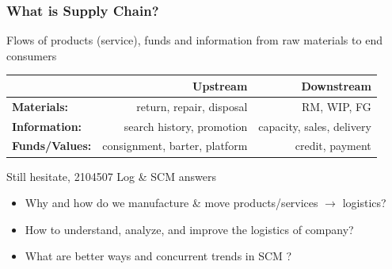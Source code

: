 \documentclass[10pt,handout]{beamer}
\begin{document}
\begin{frame}
  \frametitle{What is Supply Chain?}

  \begin{alertblock}{}{}
  Flows of \alert{products} (service), \alert{funds} and \alert{information} from \alert{raw materials} to \alert{end consumers}
  \end{alertblock}

  \NextLine
  \begin{center}\small{
    \begin{tabular}{l|rr} \hline
                              & Upstream  & Downstream \\ \hline
    \textbf{Materials:}   & return, repair, disposal      & RM, WIP, FG   \\
    \textbf{Information:} & search history, promotion     & capacity, sales, delivery  \\
    \textbf{Funds/Values:}& consignment, barter, platform & credit, payment\\ \hline
    \end{tabular} }
  \end{center}

  \NextLine
  \begin{block}{\small{Still hesitate, 2104507 Log \& SCM answers} }{}
    \begin{itemize}
      \item Why and how do we manufacture \& move products/services $\rightarrow$ logistics?
      \item How to understand, analyze, and improve the logistics of \alert{company}?
      \item What are \alert{better ways} and concurrent trends in SCM ?
    \end{itemize}

  \end{block}


\end{frame}
\end{document}
